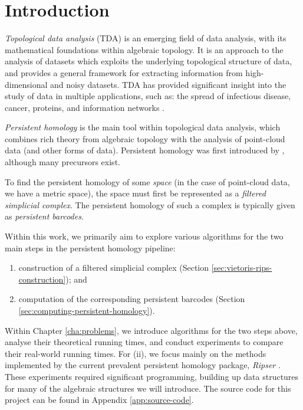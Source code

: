 \chapter{Introduction}

\emph{Topological data analysis} (TDA) is an emerging field of data analysis, with its mathematical foundations within algebraic topology. It is an approach to the analysis of datasets which exploits the underlying topological structure of data, and provides a general framework for extracting information from high-dimensional and noisy datasets. TDA has provided significant insight into the study of data in multiple applications, such as: the spread of infectious disease, cancer, proteins, and information networks \cite{otter2017roadmap}.

\emph{Persistent homology} is the main tool within topological data analysis, which combines rich theory from algebraic topology with the analysis of point-cloud data (and other forms of data). Persistent homology was first introduced by \textcite{edelsbrunner2000topological}, although many precursors exist.

To find the persistent homology of some \emph{space} (in the case of point-cloud data, we have a metric space), the space must first be represented as a \emph{filtered simplicial complex}. The persistent homology of such a complex is typically given as \emph{persistent barcodes}.

Within this work, we primarily aim to explore various algorithms for the two main steps in the persistent homology pipeline:
\begin{enumerate}
    \item construction of a filtered simplicial complex (Section \ref{sec:vietoris-rips-construction}); and
    \item computation of the corresponding persistent barcodes (Section \ref{sec:computing-persistent-homology}).
\end{enumerate}
Within Chapter \ref{cha:problems}, we introduce algorithms for the two steps above, analyse their theoretical running times, and conduct experiments to compare their real-world running times. For (ii), we focus mainly on the methods implemented by the current prevalent persistent homology package, \emph{Ripser} \cite{bauer2021ripser}. These experiments required significant programming, building up data structures for many of the algebraic structures we will introduce. The source code for this project can be found in Appendix \ref{app:source-code}.

